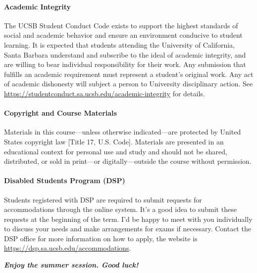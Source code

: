 \documentclass[11pt,letterpaper]{article}
\begin{document}
\paragraph*{Academic Integrity} The UCSB Student Conduct Code exists to support the highest standards of social and academic behavior and ensure an environment conducive to student learning. It is expected that students attending the University of California, Santa Barbara understand and subscribe to the ideal of academic integrity, and are willing to bear individual responsibility for their work. Any submission that fulfills an academic requirement must represent a student’s original work. Any act of academic dishonesty will subject a person to University disciplinary action. See \href{https://studentconduct.sa.ucsb.edu/academic-integrity}{https://studentconduct.sa.ucsb.edu/academic-integrity} for details.

\paragraph*{Copyright and Course Materials} Materials in this course—unless otherwise indicated—are protected by United States copyright law [Title 17, U.S. Code].  Materials are presented in an educational context for personal use and study and should not be shared, distributed, or sold in print—or digitally—outside the course without permission.

\paragraph*{Disabled Students Program (DSP)} Students registered with DSP are required to submit requests for accommodations through the online system. It's a good idea to submit these requests at the beginning of the term. I'd be happy to meet with you individually to discuss your needs and make arrangements for exams if necessary. Contact the DSP office for more information on how to apply, the website is \href{https://dsp.sa.ucsb.edu/accommodations}{https://dsp.sa.ucsb.edu/accommodations}.

\vspace*{0.2in}

\noindent
\textbf{\emph{Enjoy the summer session.  Good luck!}}
\end{document}
